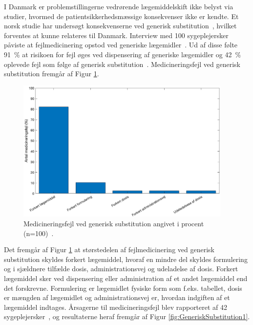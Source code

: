 I Danmark er problemstillingerne vedrørende lægemiddelskift ikke belyst via studier, hvormed de patientsikkerhedsmæssige konsekvenser ikke er kendte. 
Et norsk studie har undersøgt konsekvenserne ved generisk substitution~\citep{Hakonsen2010}, hvilket forventes at kunne relateres til Danmark. Interview med 100 sygeplejersker påviste at fejlmedicinering opstod ved generiske lægemidler~\citep{Hakonsen2010}. Ud af disse følte %
91~\% at risikoen for fejl øges ved dispensering af generiske lægemidler og 42~\% oplevede fejl som følge af generisk substitution~\citep{Hakonsen2010}.
Medicineringsfejl ved generisk substitution fremgår af Figur \ref{fig:GeneriskSubstitution}.

\begin{figure}[H]\centering	\includegraphics[width=0.95\textwidth]{billeder/GenSubb.png} 
	\caption{Medicineringsfejl ved generisk substitution angivet i procent (n=100)~\citep{Hakonsen2010}.}
	\label{fig:GeneriskSubstitution}  
\end{figure}
\vspace{-0.5cm}

Det fremgår af Figur \ref{fig:GeneriskSubstitution} at størstedelen af fejlmedicinering ved generisk substitution skyldes forkert lægemiddel, hvoraf en mindre del skyldes formulering og i sjældnere tilfælde dosis, administrationsvej og udeladelse af dosis. Forkert lægemiddel sker ved dispensering eller administration af et andet lægemiddel end det forskrevne. Formulering er lægemidlet fysiske form som f.eks. tabellet, dosis er mængden af lægemidlet og administrationsvej er, hvordan indgiften af et lægemiddel indtages. Årsagerne til medicineringsfejl blev rapporteret af 42 sygeplejersker~\citep{Hakonsen2010}, og resultaterne heraf fremgår af Figur \ref{fig:GeneriskSubstitution1}.

